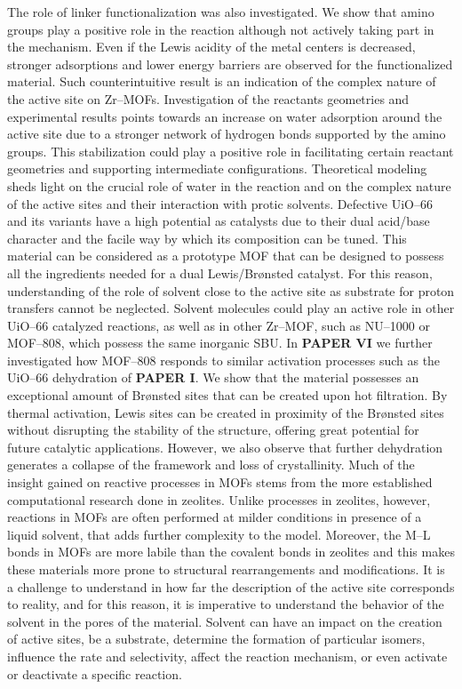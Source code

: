 The role of linker functionalization was also investigated. We show that amino groups play a positive role in the reaction although not actively taking part in the mechanism. Even if the Lewis acidity of the metal centers is decreased, stronger adsorptions and lower energy barriers are observed for the functionalized material. Such counterintuitive result is an indication of the complex nature of the active site on Zr--MOFs. Investigation of the reactants geometries and experimental results points towards an increase on water adsorption around the active site due to a stronger network of hydrogen bonds supported by the amino groups. This stabilization could play a positive role in facilitating certain reactant geometries and supporting intermediate configurations. Theoretical modeling sheds light on the crucial role of water in the reaction and on the complex nature of the active sites and their interaction with protic solvents. Defective UiO--66 and its variants have a high potential as catalysts due to their dual acid/base character and the facile way by which its composition can be tuned. This material can be considered as a prototype MOF that can be designed to possess all the ingredients needed for a dual Lewis/Br\o{}nsted catalyst. For this reason, understanding of the role of solvent close to the active site as substrate for proton transfers cannot be neglected. Solvent molecules could play an active role in other UiO--66 catalyzed reactions, as well as in other Zr--MOF, such as NU--1000 or MOF--808, which possess the same inorganic SBU. 
\npar
In \textbf{PAPER VI} we further investigated how MOF--808 responds to similar activation processes such as the UiO--66 dehydration of \textbf{PAPER I}. We show that the material possesses an exceptional amount of Br\o{}nsted sites that can be created upon hot filtration. By thermal activation, Lewis sites can be created in proximity of the Br\o{}nsted sites without disrupting the stability of the structure, offering great potential for future catalytic applications. However, we also observe that further dehydration generates a collapse of the framework and loss of crystallinity.
\npar
Much of the insight gained on reactive processes in MOFs stems from the more established computational research done in zeolites. Unlike processes in zeolites, however, reactions in MOFs are often performed at milder conditions in presence of a liquid solvent, that adds further complexity to the model. Moreover, the M--L bonds in MOFs are more labile than the covalent bonds in zeolites and this makes these materials more prone to structural rearrangements and modifications. It is a challenge to understand in how far the description of the active site corresponds to reality, and for this reason, it is imperative to understand the behavior of the solvent in the pores of the material. Solvent can have an impact on the creation of active sites, be a substrate, determine the formation of particular isomers, influence the rate and selectivity, affect the reaction mechanism, or even activate or deactivate a specific reaction.
